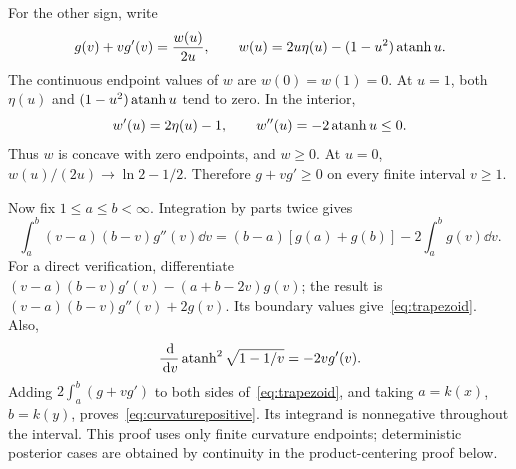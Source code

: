 For the other sign, write
\[
g(v)+vg'(v)=\frac{w(u)}{2u},\qquad
w(u)=2u\eta(u)-(1-u^2)\operatorname{atanh} u.
\]
The continuous endpoint values of $w$ are $w(0)=w(1)=0$. At $u=1$, both $\eta(u)$ and $(1-u^2)\operatorname{atanh} u$ tend to zero. In the interior,
\[
w'(u)=2\eta(u)-1,\qquad w''(u)=-2\operatorname{atanh} u\le0.
\]
Thus $w$ is concave with zero endpoints, and $w\ge0$. At $u=0$, $w(u)/(2u)\to\ln2-1/2$. Therefore $g+vg'\ge0$ on every finite interval $v\ge1$.

Now fix $1\le a\le b<\infty$. Integration by parts twice gives
\begin{equation}\label{eq:trapezoid}
\int_a^b(v-a)(b-v)g''(v)\dd v
=(b-a)[g(a)+g(b)]-2\int_a^b g(v)\dd v.
\end{equation}
For a direct verification, differentiate
$(v-a)(b-v)g'(v)-(a+b-2v)g(v)$; the result is
$(v-a)(b-v)g''(v)+2g(v)$. Its boundary values give~\eqref{eq:trapezoid}.
Also,
\[
\frac{\,\mathrm d}{\,\mathrm d v}\operatorname{atanh}^2\sqrt{1-1/v}=-2vg'(v).
\]
Adding $2\int_a^b(g+vg')$ to both sides of~\eqref{eq:trapezoid}, and taking $a=k(x)$, $b=k(y)$, proves~\eqref{eq:curvaturepositive}. Its integrand is nonnegative throughout the interval. This proof uses only finite curvature endpoints; deterministic posterior cases are obtained by continuity in the product-centering proof below.

